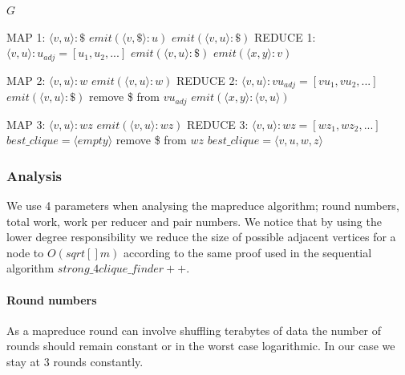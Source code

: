\documentclass{article}
\begin{document}
\begin{algorithm}
\label{mrAlgorithm}
\caption{$mr\_strong\_4clique\_finder$}
\begin{algorithmic}
\REQUIRE $G$
	
\REQUIRE MAP 1: $\langle v,u\rangle :\$$
		\STATE $emit(\langle v,\$\rangle :u)$
		\STATE $emit(\langle v,u\rangle :\$)$
	\ENDIF
\REQUIRE REDUCE 1: $\langle v,u\rangle :u_{adj} = [u_1,u_2,...]$
		\STATE $emit(\langle v,u\rangle :\$)$
	\ENDIF
				\STATE $emit(\langle x,y\rangle :v)$
			\ENDIF
		\ENDFOR
	\ENDFOR

\REQUIRE MAP 2: $\langle v,u\rangle :w$
	\STATE $emit(\langle v,u\rangle :w)$
\REQUIRE REDUCE 2: $\langle v,u\rangle : vu_{adj} = [vu_1,vu_2,...]$
		\STATE $emit(\langle v,u\rangle : \$)$
		\STATE remove \$ from $vu_{adj}$
	\ENDIF
				\STATE $emit(\langle x,y\rangle :\langle v,u\rangle)$
			\ENDIF
		\ENDFOR
	\ENDFOR

\REQUIRE MAP 3: $\langle v,u\rangle :wz$
	\STATE $emit(\langle v,u\rangle :wz)$
\REQUIRE REDUCE 3: $\langle v,u\rangle :wz = [wz_1,wz_2,...]$
	\STATE $best\_clique = \langle empty\rangle $
	\STATE remove \$ from $wz$
				\STATE $best\_clique = \langle v,u,w,z\rangle$
			\ENDIF
		\ENDFOR
	\ENDIF
\end{algorithmic}
\end{algorithm}

\subsubsection{Analysis}
We use 4 parameters when analysing the mapreduce algorithm; round numbers, total work, work per reducer and pair numbers. We notice that by using the lower degree responsibility we reduce the size of possible adjacent vertices for a node to $O(sqrt[]{m})$ according to the same proof \cite{AlgorithmicAspects} used in the sequential algorithm $strong\_4clique\_finder++$.

\paragraph{Round numbers}
As a mapreduce round can involve shuffling terabytes of data the number of rounds should remain constant or in the worst case logarithmic. In our case we stay at 3 rounds constantly.
\end{document}

